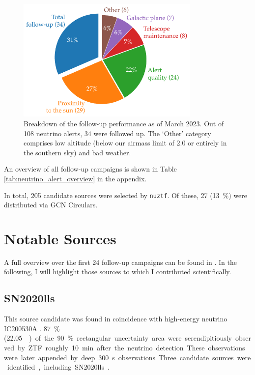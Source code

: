\documentclass[
    a4paper, %
    fontsize=10pt, %
    twoside=true, %
    numbers=noenddot, %
    fontmethod=tex,
]{kaobook}
\begin{document}
\begin{figure}[h!]
    \includegraphics[width=0.8\textwidth]{fu/follow_up_overview.pdf}
    \caption[Follow-up performance]{Breakdown of the follow-up performance as of March 2023. Out of 108 neutrino alerts, 34 were followed up. The `Other' category comprises low altitude (below our airmass limit of 2.0 or entirely in the southern sky) and bad weather.}
\end{figure}

An overview of all follow-up campaigns is shown in Table \ref{tab:neutrino_alert_overview} in the appendix.

In total, 205 candidate sources were selected by \texttt{nuztf}. Of these, 27 (\SI{13}{\percent}) were distributed via GCN Circulars.

\section{Notable Sources}
A full overview over the first 24 follow-up campaigns can be found in . In the following, I will highlight those sources to which I contributed scientifically.

\subsection{SN2020lls}
This source candidate was found in coincidence with high-energy neutrino IC200530A . \SI{87}{\percent} (\SI{22.05}{\square\deg}) of the \SI{90}{\percent} rectangular uncertainty area were serendipitiously observed by ZTF roughly \SI{10}{\minute} after the neutrino detection. These observations were later appended by deep \SI{300}{\second} observations Three candidate sources were identified, including SN2020lls . 
\end{document}
